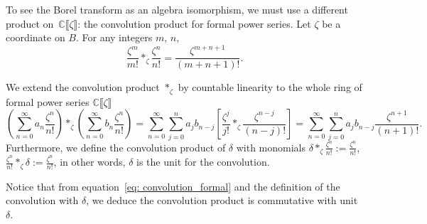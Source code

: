 \documentclass[10pt,a4paper]{amsart}
\newcommand{\C}{\mathbb{C}}
\numberwithin{equation}{section}
\begin{document}
To see the Borel transform as an algebra isomorphism, we must use a different product on~$\C\llbracket\zeta\rrbracket$: the convolution product for formal power series. Let $\zeta$ be a coordinate on $B$. For any integers $m$, $n$,
\begin{equation}\label{eq: convolution_formal}
\frac{\zeta^m}{m!} \ast_\zeta \frac{\zeta^n}{n!} = \frac{\zeta^{m+n+1}}{(m+n+1)!} .
\end{equation}
\begin{Definition}\label{def:convolution_formal}
We extend the convolution product $\ast_\zeta$ by countable linearity to the whole ring of formal power series $\C\llbracket\zeta\rrbracket$
\begin{equation*}
 \left( \sum_{n=0}^\infty a_n \frac{\zeta^n}{n!}\right)\ast_\zeta\left(\sum_{n=0}^\infty b_n\frac{\zeta^n}{n!}\right)=\sum_{n=0}^\infty\sum_{j=0}^na_jb_{n-j}\left[\frac{\zeta^j}{j!}\ast_\zeta\frac{\zeta^{n-j}}{(n-j)!}\right]=\sum_{n=0}^\infty\sum_{j=0}^na_jb_{n-j}\frac{\zeta^{n+1}}{(n+1)!}.
\end{equation*}
Furthermore, we define the convolution product of $\delta$ with monomials
$
\delta\ast_\zeta\frac{\zeta^n}{n!}:=\frac{\zeta^n}{n!}$, $
\frac{\zeta^n}{n!}\ast_\zeta\delta:=\frac{\zeta^n}{n!}$,
in other words, $\delta$ is the unit for the convolution.
\end{Definition}
Notice that from equation~\eqref{eq: convolution_formal} and the definition of the convolution with $\delta$, we deduce the convolution product is commutative with unit $\delta$.
\end{document}

